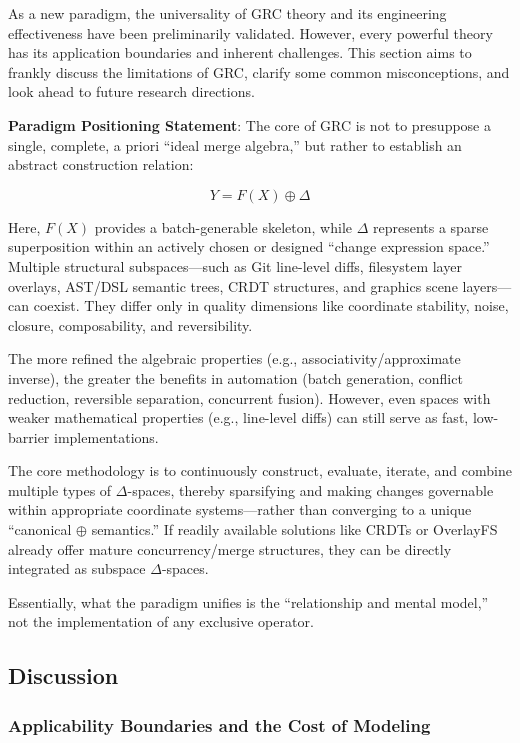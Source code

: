 \documentclass[11pt]{article}
\begin{document}
As a new paradigm, the universality of GRC theory and its engineering effectiveness have been preliminarily validated. However, every powerful theory has its application boundaries and inherent challenges. This section aims to frankly discuss the limitations of GRC, clarify some common misconceptions, and look ahead to future research directions.

\textbf{Paradigm Positioning Statement}: The core of GRC is not to presuppose a single, complete, a priori ``ideal merge algebra,'' but rather to establish an abstract construction relation:

\[
Y = F(X) \oplus \Delta
\]

Here, \( F(X) \) provides a batch-generable skeleton, while \( \Delta \) represents a sparse superposition within an actively chosen or designed ``change expression space.'' Multiple structural subspaces—such as Git line-level diffs, filesystem layer overlays, AST/DSL semantic trees, CRDT structures, and graphics scene layers—can coexist. They differ only in quality dimensions like coordinate stability, noise, closure, composability, and reversibility.

The more refined the algebraic properties (e.g., associativity/approximate inverse), the greater the benefits in automation (batch generation, conflict reduction, reversible separation, concurrent fusion). However, even spaces with weaker mathematical properties (e.g., line-level diffs) can still serve as fast, low-barrier implementations.

The core methodology is to continuously construct, evaluate, iterate, and combine multiple types of \( \Delta \)-spaces, thereby sparsifying and making changes governable within appropriate coordinate systems—rather than converging to a unique ``canonical \( \oplus \) semantics.'' If readily available solutions like CRDTs or OverlayFS already offer mature concurrency/merge structures, they can be directly integrated as subspace \( \Delta \)-spaces.

Essentially, what the paradigm unifies is the ``relationship and mental model,'' not the implementation of any exclusive operator.


\subsection{Discussion}

\subsubsection{Applicability Boundaries and the Cost of Modeling}
\end{document}
